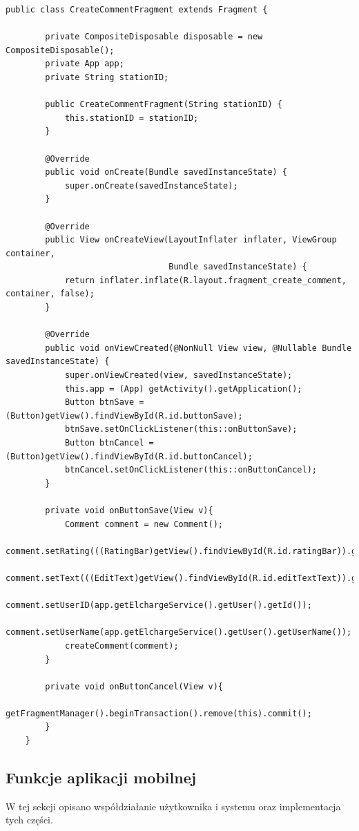 \begin{lstlisting}[label=list:CreateCommentFragment,caption=Klasa opisująca zachowanie elementów na fragemencie tworzenia komentarza,basicstyle=\tiny\ttfamily]
    public class CreateCommentFragment extends Fragment {

        private CompositeDisposable disposable = new CompositeDisposable();
        private App app;
        private String stationID;
    
        public CreateCommentFragment(String stationID) {
            this.stationID = stationID;
        }
    
        @Override
        public void onCreate(Bundle savedInstanceState) {
            super.onCreate(savedInstanceState);
        }
    
        @Override
        public View onCreateView(LayoutInflater inflater, ViewGroup container,
                                 Bundle savedInstanceState) {
            return inflater.inflate(R.layout.fragment_create_comment, container, false);
        }
    
        @Override
        public void onViewCreated(@NonNull View view, @Nullable Bundle savedInstanceState) {
            super.onViewCreated(view, savedInstanceState);
            this.app = (App) getActivity().getApplication();
            Button btnSave = (Button)getView().findViewById(R.id.buttonSave);
            btnSave.setOnClickListener(this::onButtonSave);
            Button btnCancel = (Button)getView().findViewById(R.id.buttonCancel);
            btnCancel.setOnClickListener(this::onButtonCancel);
        }
    
        private void onButtonSave(View v){
            Comment comment = new Comment();
            comment.setRating(((RatingBar)getView().findViewById(R.id.ratingBar)).getRating());
            comment.setText(((EditText)getView().findViewById(R.id.editTextText)).getText().toString());
            comment.setUserID(app.getElchargeService().getUser().getId());
            comment.setUserName(app.getElchargeService().getUser().getUserName());
            createComment(comment);
        }
    
        private void onButtonCancel(View v){
            getFragmentManager().beginTransaction().remove(this).commit();
        }
    }
\end{lstlisting}

\subsection{Funkcje aplikacji mobilnej}
W tej sekcji opisano współdziałanie użytkownika i systemu oraz implementacja tych części.

